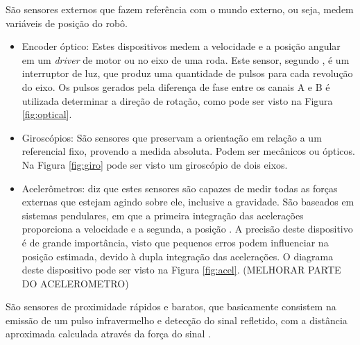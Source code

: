  São sensores externos que fazem referência com o mundo externo, ou seja, medem variáveis de 
posição do robô.
  \begin{itemize}
   \item Encoder óptico: Estes dispositivos medem a velocidade e a posição angular em um \textit{driver} de motor ou no eixo de uma 
   roda. Este sensor, segundo , é um interruptor de luz, que produz uma quantidade de pulsos para cada revolução 
   do eixo. Os pulsos gerados pela diferença de fase entre os canais A e B é utilizada determinar a direção de rotação, como pode 
   ser visto na Figura \ref{fig:optical}.
   
   \item Giroscópios: São sensores que preservam a orientação em relação a um referencial fixo, provendo a medida absoluta. Podem ser 
   mecânicos ou ópticos. Na Figura \ref{fig:giro} pode ser visto um giroscópio de dois eixos.
   
   \item Acelerômetros:  diz que estes sensores são capazes de medir todas as forças externas que estejam 
   agindo sobre ele, inclusive a gravidade. 
   São baseados em sistemas pendulares, em que a primeira integração das acelerações proporciona a velocidade e a 
   segunda, a posição \cite{secchi2012}. A precisão deste dispositivo é de grande importância, visto que pequenos erros podem 
   influenciar na posição estimada, devido à dupla integração das acelerações. O diagrama deste dispositivo pode ser visto na Figura 
   \ref{fig:acel}. (MELHORAR PARTE DO ACELEROMETRO)
  \end{itemize}
  
 São sensores de proximidade rápidos e baratos, que basicamente consistem na emissão de 
 um pulso infravermelho e detecção do sinal refletido, com a distância aproximada calculada através da 
 força do sinal \cite{dudek_mobile}.
 
